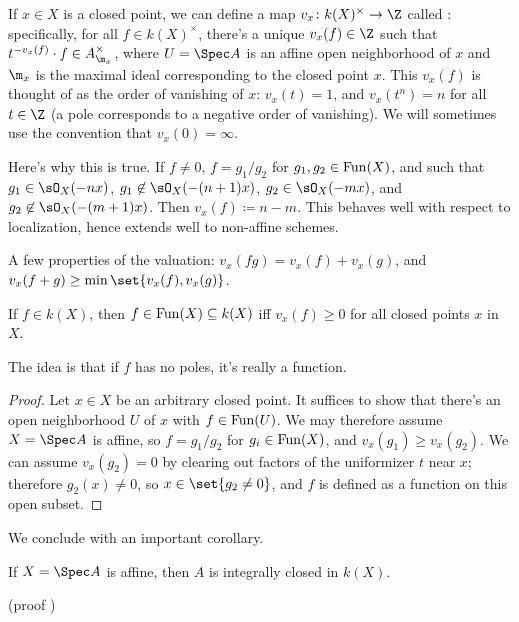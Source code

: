 If $x\in X$ is a closed point, we can define a map $v_x\colon k(X)^\times\to\Z$ called :
specifically, for all $f\in k(X)^\times$, there's a unique $v_x(f)\in\Z$ such that $t^{-v_x(f)}\cdot f\in
A_{\m_x}^\times$, where $U = \Spec A$ is an affine open neighborhood of $x$ and $\m_x$ is the maximal ideal
corresponding to the closed point $x$. This $v_x(f)$ is thought of as the order of vanishing of $x$: $v_x(t) = 1$,
and $v_x(t^n) = n$ for all $t\in\Z$ (a pole corresponds to a negative order of vanishing). We will sometimes use
the convention that $v_x(0) = \infty$.

Here's why this is true. If $f\ne 0$, $f = g_1/g_2$ for $g_1,g_2\in \mathrm{Fun}(X)$, and such that $g_1\in\sO_X(-nx)$,
$g_1\not\in\sO_X(-(n+1)x)$, $g_2\in\sO_X(-mx)$, and $g_2\not\in\sO_X(-(m+1)x)$. Then $v_x(f)\coloneqq n-m$. This
behaves well with respect to localization, hence extends well to non-affine schemes.
\begin{rem}
A few properties of the valuation: $v_x(fg) = v_x(f) + v_x(g)$, and $v_x(f+g) \ge \min\set{v_x(f), v_x(g)}$.
\end{rem}
\begin{lem}
If $f\in k(X)$, then $f\in\mathrm{Fun}(X)\subseteq k(X)$ iff $v_x(f)\ge 0$ for all closed points $x$ in $X$.
\end{lem}
The idea is that if $f$ has no poles, it's really a function.
\begin{proof}
Let $x\in X$ be an arbitrary closed point. It suffices to show that there's an open neighborhood $U$ of $x$ with
$f\in\mathrm{Fun}(U)$. We may therefore assume $X = \Spec A$ is affine, so $f = g_1/g_2$ for $g_i\in\mathrm{Fun}(X)$, and $v_x(g_1)
\ge v_x(g_2)$. We can assume $v_x(g_2) = 0$ by clearing out factors of the uniformizer $t$ near $x$; therefore
$g_2(x)\ne 0$, so $x\in\set{g_2\ne 0}$, and $f$ is defined as a function on this open subset.
\end{proof}
We conclude with an important corollary.
\begin{cor}
If $X = \Spec A$ is affine, then $A$ is integrally closed in $k(X)$.
\end{cor}
(proof \TODO)
